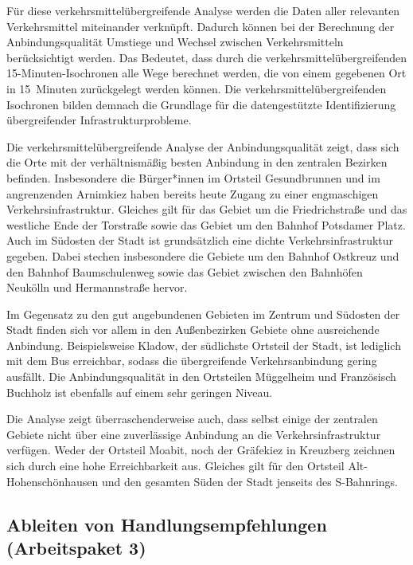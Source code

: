 Für diese verkehrsmittelübergreifende Analyse werden die Daten aller relevanten Verkehrsmittel miteinander verknüpft. Dadurch können bei der Berechnung der Anbindungsqualität Umstiege und Wechsel zwischen Verkehrsmitteln berücksichtigt werden. Das Bedeutet, dass durch die verkehrsmittelübergreifenden 15-Minuten-Isochronen alle Wege berechnet werden, die von einem gegebenen Ort in 15~Minuten zurückgelegt werden können. Die verkehrsmittelübergreifenden Isochronen bilden demnach die Grundlage für die datengestützte Identifizierung übergreifender Infrastrukturprobleme.


Die verkehrsmittelübergreifende Analyse der Anbindungsqualität zeigt, dass sich die Orte mit der verhältnismäßig besten Anbindung in den zentralen Bezirken befinden. Insbesondere die Bürger*innen im Ortsteil Gesundbrunnen und im angrenzenden Arnimkiez haben bereits heute Zugang zu einer engmaschigen Verkehrsinfrastruktur. Gleiches gilt für das Gebiet um die Friedrichstraße und das westliche Ende der Torstraße sowie das Gebiet um den Bahnhof Potsdamer Platz. Auch im Südosten der Stadt ist grundsätzlich eine dichte Verkehrsinfrastruktur gegeben. Dabei stechen insbesondere die Gebiete um den Bahnhof Ostkreuz und den Bahnhof Baumschulenweg sowie das Gebiet zwischen den Bahnhöfen Neukölln und Hermannstraße hervor.

Im Gegensatz zu den gut angebundenen Gebieten im Zentrum und Südosten der Stadt finden sich vor allem in den Außenbezirken Gebiete ohne ausreichende Anbindung. Beispielsweise Kladow, der südlichste Ortsteil der Stadt, ist lediglich mit dem Bus erreichbar, sodass die übergreifende Verkehrsanbindung gering ausfällt. Die Anbindungsqualität in den Ortsteilen Müggelheim und Französisch Buchholz ist ebenfalls auf einem sehr geringen Niveau.

Die Analyse zeigt überraschenderweise auch, dass selbst einige der zentralen Gebiete nicht über eine zuverlässige Anbindung an die Verkehrsinfrastruktur verfügen. Weder der Ortsteil Moabit, noch der Gräfekiez in Kreuzberg zeichnen sich durch eine hohe Erreichbarkeit aus. Gleiches gilt für den Ortsteil Alt-Hohenschönhausen und den gesamten Süden der Stadt jenseits des S-Bahnrings.

\subsection{Ableiten von Handlungsempfehlungen (Arbeitspaket 3)}
\label{ableiten_von_handlungsempfehlungen_arbeitspaket_3}

